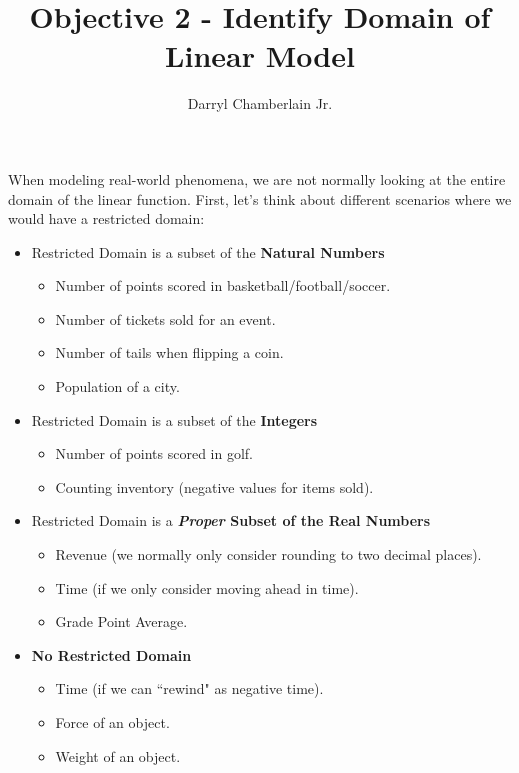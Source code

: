 \documentclass{ximera}
\author{Darryl Chamberlain Jr.}
\title{Objective 2 - Identify Domain of Linear Model}
\begin{document}
\begin{abstract}

\end{abstract}

\maketitle
 

When modeling real-world phenomena, we are not normally looking at the entire domain of the linear function. First, let's think about different scenarios where we would have a restricted domain: 

\begin{itemize}
	\item Restricted Domain is a subset of the \textbf{Natural Numbers}
		\begin{itemize}
			\item Number of points scored in basketball/football/soccer.
			\item Number of tickets sold for an event.
			\item Number of tails when flipping a coin.
			\item Population of a city.
		\end{itemize}
	\item Restricted Domain is a subset of the \textbf{Integers}
		\begin{itemize}
			\item Number of points scored in golf. 
			\item Counting inventory (negative values for items sold).
		\end{itemize}
	\item Restricted Domain is a \textbf{\textit{Proper} Subset of the Real Numbers}
		\begin{itemize}
			\item Revenue (we normally only consider rounding to two decimal places).
			\item Time (if we only consider moving ahead in time).
			\item Grade Point Average.
		\end{itemize}
	\item \textbf{No Restricted Domain} 
		\begin{itemize}
			\item Time (if we can ``rewind" as negative time).
			\item Force of an object.
			\item Weight of an object.
		\end{itemize}
\end{itemize}
\end{document}
